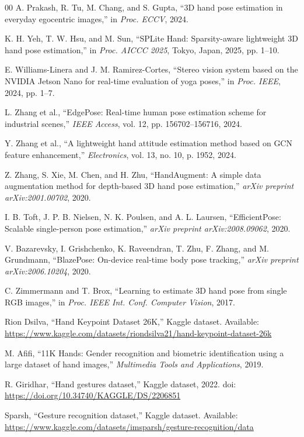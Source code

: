 \documentclass[10pt,letterpaper]{article}
\begin{document}
\begin{thebibliography}{00}
A. Prakash, R. Tu, M. Chang, and S. Gupta, ``3D hand pose estimation in everyday egocentric images,'' in \emph{Proc. ECCV}, 2024.

K. H. Yeh, T. W. Hsu, and M. Sun, ``SPLite Hand: Sparsity-aware lightweight 3D hand pose estimation,'' in \emph{Proc. AICCC 2025}, Tokyo, Japan, 2025, pp. 1--10.

E. Williams-Linera and J. M. Ramirez-Cortes, ``Stereo vision system based on the NVIDIA Jetson Nano for real-time evaluation of yoga poses,'' in \emph{Proc. IEEE}, 2024, pp. 1--7.

L. Zhang et al., ``EdgePose: Real-time human pose estimation scheme for industrial scenes,'' \emph{IEEE Access}, vol. 12, pp. 156702--156716, 2024.

Y. Zhang et al., ``A lightweight hand attitude estimation method based on GCN feature enhancement,'' \emph{Electronics}, vol. 13, no. 10, p. 1952, 2024.

Z. Zhang, S. Xie, M. Chen, and H. Zhu, ``HandAugment: A simple data augmentation method for depth-based 3D hand pose estimation,'' \emph{arXiv preprint arXiv:2001.00702}, 2020.

I. B. Toft, J. P. B. Nielsen, N. K. Poulsen, and A. L. Laursen, ``EfficientPose: Scalable single-person pose estimation,'' \emph{arXiv preprint arXiv:2008.09062}, 2020.

V. Bazarevsky, I. Grishchenko, K. Raveendran, T. Zhu, F. Zhang, and M. Grundmann, ``BlazePose: On-device real-time body pose tracking,'' \emph{arXiv preprint arXiv:2006.10204}, 2020.

C. Zimmermann and T. Brox, ``Learning to estimate 3D hand pose from single RGB images,'' in \emph{Proc. IEEE Int. Conf. Computer Vision}, 2017.

Rion Dsilva, ``Hand Keypoint Dataset 26K,'' Kaggle dataset. Available: \url{https://www.kaggle.com/datasets/riondsilva21/hand-keypoint-dataset-26k}

M. Afifi, ``11K Hands: Gender recognition and biometric identification using a large dataset of hand images,'' \emph{Multimedia Tools and Applications}, 2019.

R. Giridhar, ``Hand gestures dataset,'' Kaggle dataset, 2022. doi: \url{https://doi.org/10.34740/KAGGLE/DS/2206851}

Sparsh, ``Gesture recognition dataset,'' Kaggle dataset. Available: \url{https://www.kaggle.com/datasets/imsparsh/gesture-recognition/data}

\end{thebibliography}
\end{document}
